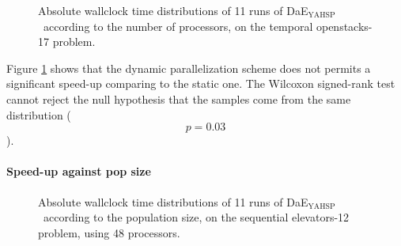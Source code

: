 \documentclass{sig-alternate}
\newcommand{\DAEYAHSP}{{\sc DaE$_{\text{YAHSP}}$}}
\begin{document}
\begin{figure}[htpb]
  \begin{center}
    \hfill
  \end{center}
  \caption{Absolute wallclock time distributions of 11 runs of \DAEYAHSP\ according to the number of processors, on the temporal openstacks-17 problem.}
  \label{fig:proc_static_vs_dynamic}
\end{figure}

Figure \ref{fig:proc_static_vs_dynamic} shows that the dynamic parallelization
scheme does not permits a significant speed-up comparing to the static one. The
Wilcoxon signed-rank test cannot reject the null hypothesis that the samples come
from the same distribution ($$p=0.03$$).

\paragraph{Speed-up against pop size} %

\begin{figure}[htpb]
  \begin{center}
    \hfill
  \end{center}
  \caption{Absolute wallclock time distributions of 11 runs of \DAEYAHSP\ according to the population size, on the sequential elevators-12 problem, using 48 processors.}
  \label{fig:elevators_pop}
\end{figure}
\end{document}

